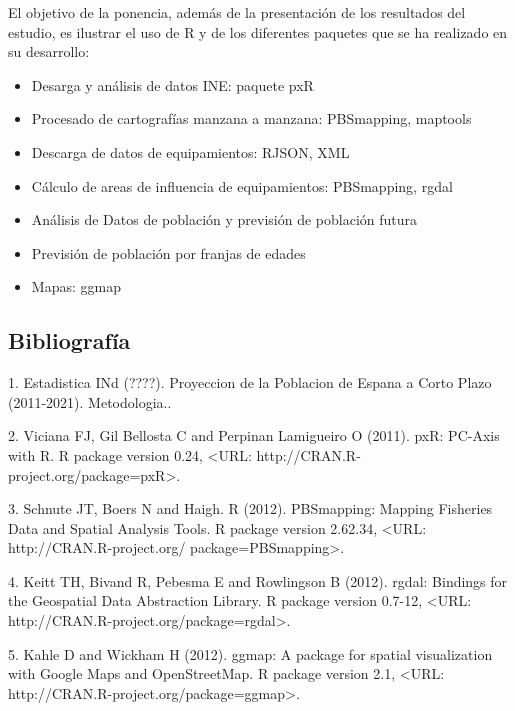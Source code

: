 El objetivo de la ponencia, además de  la presentación de los resultados del estudio, es ilustrar el uso de R y de los diferentes paquetes que se ha realizado en su desarrollo:
\begin{itemize}
\item Desarga y análisis de datos INE: paquete pxR
\item Procesado de cartografías manzana a manzana: PBSmapping, maptools
\item Descarga de datos de equipamientos: RJSON, XML
\item Cálculo de areas de influencia de equipamientos: PBSmapping, rgdal
\item Análisis de Datos de población y previsión de población futura 
\item Previsión de población por franjas de edades 
\item Mapas: ggmap
\end{itemize} \bigskip\subsection*{Bibliografía}

 1. Estadistica INd (????). Proyeccion de la Poblacion de Espana a Corto Plazo (2011-2021). Metodologia..

2. Viciana FJ, Gil Bellosta C and Perpinan Lamigueiro O (2011). pxR: PC-Axis with R. R package version 0.24, <URL: http://CRAN.R-project.org/package=pxR>.

3. Schnute JT, Boers N and Haigh. R (2012). PBSmapping: Mapping Fisheries Data and Spatial Analysis Tools. R package version 2.62.34, <URL: http://CRAN.R-project.org/ package=PBSmapping>.

4. Keitt TH, Bivand R, Pebesma E and Rowlingson B (2012). rgdal: Bindings for the Geospatial Data Abstraction Library. R package version 0.7-12, <URL: http://CRAN.R-project.org/package=rgdal>.

5. Kahle D and Wickham H (2012). ggmap: A package for spatial visualization with Google Maps and  OpenStreetMap. R package version 2.1, <URL: http://CRAN.R-project.org/package=ggmap>.



%

%
